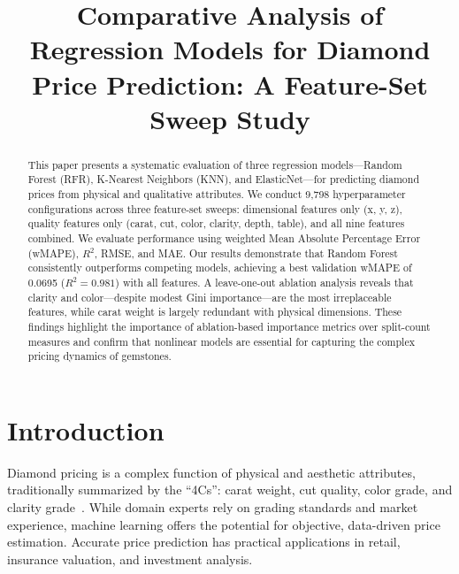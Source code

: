 \documentclass[conference]{IEEEtran}
\begin{document}
\title{Comparative Analysis of Regression Models for Diamond Price Prediction: A Feature-Set Sweep Study}

\author{
}

\maketitle

\begin{abstract}
This paper presents a systematic evaluation of three regression models---Random Forest (RFR), K-Nearest Neighbors (KNN), and ElasticNet---for predicting diamond prices from physical and qualitative attributes. We conduct 9,798 hyperparameter configurations across three feature-set sweeps: dimensional features only (x, y, z), quality features only (carat, cut, color, clarity, depth, table), and all nine features combined. We evaluate performance using weighted Mean Absolute Percentage Error (wMAPE), $R^2$, RMSE, and MAE. Our results demonstrate that Random Forest consistently outperforms competing models, achieving a best validation wMAPE of 0.0695 ($R^2=0.981$) with all features. A leave-one-out ablation analysis reveals that clarity and color---despite modest Gini importance---are the most irreplaceable features, while carat weight is largely redundant with physical dimensions. These findings highlight the importance of ablation-based importance metrics over split-count measures and confirm that nonlinear models are essential for capturing the complex pricing dynamics of gemstones.
\end{abstract}

\section{Introduction}

Diamond pricing is a complex function of physical and aesthetic attributes, traditionally summarized by the ``4Cs'': carat weight, cut quality, color grade, and clarity grade~\cite{b1}. While domain experts rely on grading standards and market experience, machine learning offers the potential for objective, data-driven price estimation. Accurate price prediction has practical applications in retail, insurance valuation, and investment analysis.
\end{document}
